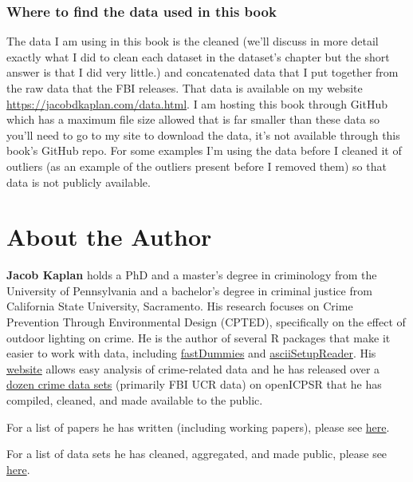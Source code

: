 \documentclass[
  12pt,
  openany]{book}
\begin{document}
\hypertarget{where-to-find-the-data-used-in-this-book}{%
\subsection{Where to find the data used in this book}\label{where-to-find-the-data-used-in-this-book}}

The data I am using in this book is the cleaned (we'll discuss in more detail exactly what I did to clean each dataset in the dataset's chapter but the short answer is that I did very little.) and concatenated data that I put together from the raw data that the FBI releases. That data is available on my website \href{here}{https://jacobdkaplan.com/data.html}. I am hosting this book through GitHub which has a maximum file size allowed that is far smaller than these data so you'll need to go to my site to download the data, it's not available through this book's GitHub repo. For some examples I'm using the data before I cleaned it of outliers (as an example of the outliers present before I removed them) so that data is not publicly available.

\hypertarget{about-the-author}{%
\chapter*{About the Author}\label{about-the-author}}


\textbf{Jacob Kaplan} holds a PhD and a master's degree in criminology from the University of Pennsylvania and a bachelor's degree in criminal justice from California State University, Sacramento. His research focuses on Crime Prevention Through Environmental Design (CPTED), specifically on the effect of outdoor lighting on crime. He is the author of several R packages that make it easier to work with data, including \href{https://jacobkap.github.io/fastDummies/}{fastDummies} and \href{https://jacobkap.github.io/asciiSetupReader/}{asciiSetupReader}. His \href{http://jacobdkaplan.com/}{website} allows easy analysis of crime-related data and he has released over a \href{http://jacobdkaplan.com/data.html}{dozen crime data sets} (primarily FBI UCR data) on openICPSR that he has compiled, cleaned, and made available to the public.

For a list of papers he has written (including working papers), please see \href{http://jacobdkaplan.com/research.html}{here}.

For a list of data sets he has cleaned, aggregated, and made public, please see \href{http://jacobdkaplan.com/data.html}{here}.
\end{document}
